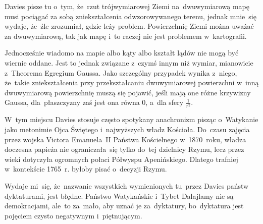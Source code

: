 \documentclass[a4paper,11pt]{article}
\begin{document}
\vspace{\spaceTwo}














\start {} Davies pisze tu o~tym, że~rzut trójwymiarowej Ziemi
na~dwuwymiarową mapę musi pociągać za sobą zniekształcenia
odwzorowywanego terenu, jednak mnie~się wydaje, że~źle zrozumiał,
gdzie leży problem. Powierzchnię Ziemi można uważać za dwuwymiarową,
tak jak mapę i~to raczej nie jest problemem w~kartografii.

Jednocześnie wiadomo na mapie albo kąty albo kształt lądów nie mogą
być wiernie oddane. Jest to jednak związane z~czymś innym niż wymiar,
mianowicie z~Theorema Egregium Gaussa. Jako szczególny przypadek
wynika z~niego, że~takie zniekształcenia przy przekształcaniu
dwuwymiarowej powierzchni w~inną dwuwymiarową powierzchnię muszą się
pojawić, jeśli mają one różne krzywizny Gaussa, dla~płaszczyzny zaś
jest ona równa 0, a~dla sfery $\frac{ 1 }{ r^{ 2 } }$.

\vspace{\spaceFour}



\start {} W~tym miejscu Davies stosuje często spotykany
anachronizm pisząc o~Watykanie jako metonimie Ojca Świętego
i~najwyższych władz Kościoła. Do~czasu zajęcia przez wojska Victora
Emanuela~II Państwa Kościelnego w~1870~roku, władza doczesna papieża
nie ograniczała~się tylko do~tej dzielnicy Rzymu, lecz przez wieki
dotyczyła ogromnych połaci Półwyspu Apenińskiego. Dlatego trafniej
w~kontekście 1765~r. byłoby pisać o~decyzji Rzymu.

\vspace{\spaceFour}



\start {} Wydaje mi~się, że~nazwanie wszystkich wymienionych
tu~przez Davies państw dyktaturami, jest błędne. Państwo Watykańskie
i~Tybet Dalajlamy nie są demokracjami, ale~to za~mało, aby uznać je
za~dyktatury, bo~dyktatura jest pojęciem czysto negatywnym
i~piętnującym.

\vspace{\spaceFour}
\end{document}
